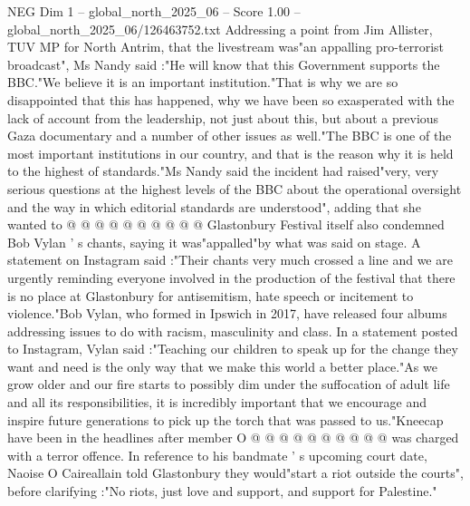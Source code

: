 \begin{textsample}{NEG Dim 1 – global\_north\_2025\_06 – Score 1.00 – global\_north\_2025\_06/126463752.txt}
Addressing a point from Jim Allister, TUV MP for North Antrim, that the livestream was"an appalling pro-terrorist broadcast", Ms Nandy said :"He will know that this Government supports the BBC."We believe it is an important institution."That is why we are so disappointed that this has happened, why we have been so exasperated with the lack of account from the leadership, not just about this, but about a previous Gaza documentary and a number of other issues as well."The BBC is one of the most important institutions in our country, and that is the reason why it is held to the highest of standards."Ms Nandy said the incident had raised"very, very serious questions at the highest levels of the BBC about the operational oversight and the way in which editorial standards are understood", adding that she wanted to @ @ @ @ @ @ @ @ @ @ Glastonbury Festival itself also condemned Bob Vylan ' s chants, saying it was"appalled"by what was said on stage.
A statement on Instagram said :"Their chants very much crossed a line and we are urgently reminding everyone involved in the production of the festival that there is no place at Glastonbury for antisemitism, hate speech or incitement to violence."Bob Vylan, who formed in Ipswich in 2017, have released four albums addressing issues to do with racism, masculinity and class.
In a statement posted to Instagram, Vylan said :"Teaching our children to speak up for the change they want and need is the only way that we make this world a better place."As we grow older and our fire starts to possibly dim under the suffocation of adult life and all its responsibilities, it is incredibly important that we encourage and inspire future generations to pick up the torch that was passed to us."Kneecap have been in the headlines after member O @ @ @ @ @ @ @ @ @ @ was charged with a terror offence.
In reference to his bandmate ' s upcoming court date, Naoise O Caireallain told Glastonbury they would"start a riot outside the courts", before clarifying :"No riots, just love and support, and support for Palestine."

\end{textsample}
